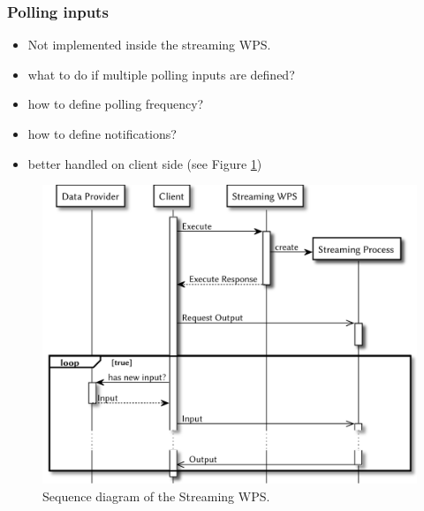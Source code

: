 	\subsubsection{Polling inputs}
		\begin{itemize}
			\item Not implemented inside the streaming WPS.
			\item what to do if multiple polling inputs are defined?
			\item how to define polling frequency?
			\item how to define notifications?
			\item better handled on client side (see Figure \ref{fig:sd:polling})
		\end{itemize}
		\begin{figure}[!htb]
			\centering
			\includegraphics[width=.7868\textwidth]{figures/sequence-diagramm-polling.pdf}
			\caption{\label{fig:sd:polling} Sequence diagram of the Streaming WPS.}
		\end{figure}

